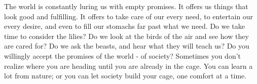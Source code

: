 \documentclass[10pt]{article}
\begin{document}
\begin{multicols}{2}
The world is constantly luring us with empty promises. It offers us things that look good and fulfilling. It offers to take care of our every need, to entertain our every desire, and even to fill our stomachs far past what we need. Do we take time to consider the lilies? Do we look at the birds of the air and see how they are cared for? Do we ask the beasts, and hear what they will teach us? Do you willingly accept the promises of the world - of society? Sometimes you don't realize where you are heading until you are already in the cage. You can learn a lot from nature; or you can let society build your cage, one comfort at a time.




\end{multicols}


\end{document}

